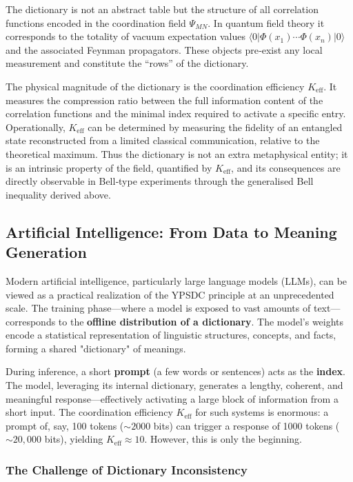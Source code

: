 \documentclass[12pt,a4paper]{article}
\theoremstyle{remark}
\newcommand{\Keff}{K_{\mathrm{eff}}}
\begin{document}
The dictionary is not an abstract table but the structure of all
correlation functions encoded in the coordination field $\Psi_{MN}$.
In quantum field theory it corresponds to the totality of vacuum
expectation values $\langle 0|\Phi(x_1)\cdots\Phi(x_n)|0\rangle$ and
the associated Feynman propagators.  These objects pre‑exist any
local measurement and constitute the ``rows'' of the dictionary.

The physical magnitude of the dictionary is the coordination efficiency
$K_{\mathrm{eff}}$.  It measures the compression ratio between the full
information content of the correlation functions and the minimal index
required to activate a specific entry.  Operationally, $K_{\mathrm{eff}}$
can be determined by measuring the fidelity of an entangled state
reconstructed from a limited classical communication, relative to the
theoretical maximum.  Thus the dictionary is not an extra metaphysical
entity; it is an intrinsic property of the field, quantified by
$K_{\mathrm{eff}}$, and its consequences are directly observable in
Bell‑type experiments through the generalised Bell inequality
derived above.

	\subsection{Artificial Intelligence: From Data to Meaning Generation}
	
	Modern artificial intelligence, particularly large language models (LLMs), can be viewed as a practical realization of the YPSDC principle at an unprecedented scale. The training phase---where a model is exposed to vast amounts of text---corresponds to the \textbf{offline distribution of a dictionary}. The model's weights encode a statistical representation of linguistic structures, concepts, and facts, forming a shared "dictionary" of meanings.
	
	During inference, a short \textbf{prompt} (a few words or sentences) acts as the \textbf{index}. The model, leveraging its internal dictionary, generates a lengthy, coherent, and meaningful response---effectively activating a large block of information from a short input. The coordination efficiency $\Keff$ for such systems is enormous: a prompt of, say, 100 tokens ($\sim 2000$ bits) can trigger a response of 1000 tokens ($\sim 20,000$ bits), yielding $\Keff \approx 10$. However, this is only the beginning.
	
	\subsubsection{The Challenge of Dictionary Inconsistency}
	
\end{document}

